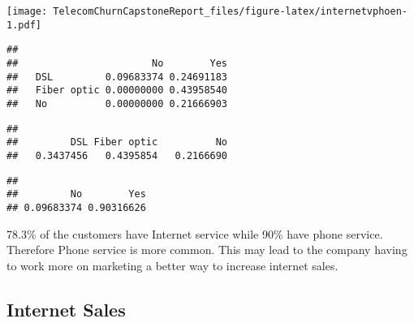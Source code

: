 \documentclass[]{article}
\newenvironment{Shaded}{\begin{snugshade}}{\end{snugshade}}
\newcommand{\KeywordTok}[1]{\textcolor[rgb]{0.13,0.29,0.53}{\textbf{#1}}}
\newcommand{\OperatorTok}[1]{\textcolor[rgb]{0.81,0.36,0.00}{\textbf{#1}}}
\newcommand{\NormalTok}[1]{#1}
\begin{document}
\texttt{[image: TelecomChurnCapstoneReport\_files/figure-latex/internetvphoen-1.pdf]}

\begin{Shaded}
\end{Shaded}

\begin{verbatim}
##              
##                       No        Yes
##   DSL         0.09683374 0.24691183
##   Fiber optic 0.00000000 0.43958540
##   No          0.00000000 0.21666903
\end{verbatim}

\begin{Shaded}
\end{Shaded}

\begin{verbatim}
## 
##         DSL Fiber optic          No 
##   0.3437456   0.4395854   0.2166690
\end{verbatim}

\begin{Shaded}
\end{Shaded}

\begin{verbatim}
## 
##         No        Yes 
## 0.09683374 0.90316626
\end{verbatim}

78.3\% of the customers have Internet service while 90\% have phone
service. Therefore Phone service is more common. This may lead to the
company having to work more on marketing a better way to increase
internet sales.

\subsection{Internet Sales}\label{internet-sales}
\end{document}
